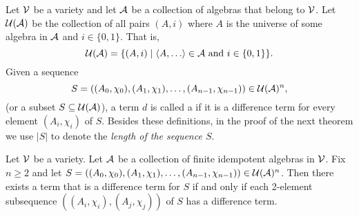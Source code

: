 Let $\mathcal{V}$ be a variety and let $\mathcal{A}$ be a collection of algebras that belong to $\mathcal{V}$.
Let $\mathcal{U}(\mathcal{A})$ be the collection of all pairs $(A, i)$ where $A$ is the universe
of some algebra in $\mathcal{A}$ and $i\in \{0,1\}$.  That is,
\[
\sU(\sA) = \{(A, i) \mid \<A, \dots\> \in \sA \text{ and } i \in \{0,1\}\}.
\]
Given a sequence
\[S = ((A_0, \chi_0), (A_1, \chi_1), \dots,
(A_{n-1},\chi_{n-1})) \in \mathcal{U}(\mathcal{A})^n,
\]
(or a subset $S \subseteq \mathcal{U}(\mathcal{A})$),
a term $d$ is called a 
if it is a \glocal difference term for every element $(A_i, \chi_i)$ of $S$.
Besides these definitions, in the proof of the next theorem we use
$|S|$ to denote the \emph{length of the sequence $S$}.

\begin{thm}
  \label{thm:glob-loc-diff-terms}
  Let $\mathcal{V}$ be a variety.  Let $\mathcal{A}$ be a collection of finite idempotent
  algebras in $\mathcal{V}$. Fix $n\geq 2$ and 
  let $S= ((A_0, \chi_0), (A_1, \chi_1), \dots, (A_{n-1}, \chi_{n-1}))\in \mathcal{U}(\mathcal{A})^n$.
  Then there exists a term that is a \glocal difference term for $S$
  if and only if each 2-element subsequence $((A_i,\chi_i), (A_j,\chi_j))$ of $S$
  has a \glocal difference term.
\end{thm}
